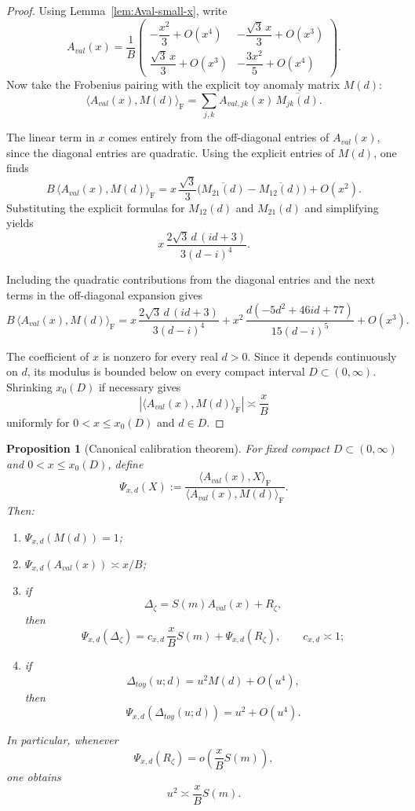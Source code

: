 \documentclass[11pt,a4paper]{amsart}
\def\toy{toy}%
\def\val{val}%
\theoremstyle{plain}
\newtheorem{proposition}[theorem]{Proposition}
\theoremstyle{definition}
\newcommand{\toy}{\mathrm{toy}}
\newcommand{\val}{\mathrm{val}}
\newcommand{\F}{\mathrm{F}}
\begin{document}
\begin{proof}
Using Lemma~\ref{lem:Aval-small-x}, write
\[
A_{\val}(x)=\frac1B
\begin{pmatrix}
-\dfrac{x^2}{3}+O(x^4) & -\dfrac{\sqrt3\,x}{3}+O(x^3)\\[1.2ex]
\dfrac{\sqrt3\,x}{3}+O(x^3) & -\dfrac{3x^2}{5}+O(x^4)
\end{pmatrix}.
\]
Now take the Frobenius pairing with the explicit toy anomaly matrix $M(d)$:
\[
\langle A_{\val}(x),M(d)\rangle_\F
=
\sum_{j,k} A_{\val,jk}(x)\,\overline{M_{jk}(d)}.
\]

The linear term in $x$ comes entirely from the off-diagonal entries of
$A_{\val}(x)$, since the diagonal entries are quadratic. Using the explicit
entries of $M(d)$, one finds
\[
B\,\langle A_{\val}(x),M(d)\rangle_\F
=
x\,\frac{\sqrt3}{3}\bigl(\overline{M_{21}(d)}-\overline{M_{12}(d)}\bigr)
+O(x^2).
\]
Substituting the explicit formulas for $M_{12}(d)$ and $M_{21}(d)$ and
simplifying yields
\[
x\,\frac{2\sqrt3\,d\,(id+3)}{3(d-i)^4}.
\]

Including the quadratic contributions from the diagonal entries and the next
terms in the off-diagonal expansion gives
\[
B\,\langle A_{\val}(x),M(d)\rangle_\F
=
x\,\frac{2\sqrt3\,d\,(id+3)}{3(d-i)^4}
+
x^2\,\frac{d(-5d^2+46id+77)}{15(d-i)^5}
+
O(x^3).
\]

The coefficient of $x$ is nonzero for every real $d>0$. Since it depends
continuously on $d$, its modulus is bounded below on every compact interval
$D\subset(0,\infty)$. Shrinking $x_0(D)$ if necessary gives
\[
|\langle A_{\val}(x),M(d)\rangle_\F|\asymp \frac{x}{B}
\]
uniformly for $0<x\le x_0(D)$ and $d\in D$.
\end{proof}

\begin{proposition}[Canonical calibration theorem]
\label{prop:canonical-calibration}
For fixed compact $D\subset(0,\infty)$ and $0<x\le x_0(D)$, define
\[
\Psi_{x,d}(X):=
\frac{\langle A_{\val}(x),X\rangle_\F}
{\langle A_{\val}(x),M(d)\rangle_\F}.
\]
Then:
\begin{enumerate}
\item $\Psi_{x,d}(M(d))=1$;
\item $\Psi_{x,d}(A_{\val}(x))\asymp x/B$;
\item if
\[
\Delta_\zeta=S(m)A_{\val}(x)+R_\zeta,
\]
then
\[
\Psi_{x,d}(\Delta_\zeta)
=
c_{x,d}\,\frac{x}{B}S(m)+\Psi_{x,d}(R_\zeta),
\qquad c_{x,d}\asymp 1;
\]
\item if
\[
\Delta_{\toy}(u;d)=u^2M(d)+O(u^4),
\]
then
\[
\Psi_{x,d}(\Delta_{\toy}(u;d))=u^2+O(u^4).
\]
\end{enumerate}
In particular, whenever
\[
\Psi_{x,d}(R_\zeta)=o\!\left(\frac{x}{B}S(m)\right),
\]
one obtains
\begin{equation}\label{eq:u2-calibration}
u^2\asymp \frac{x}{B}S(m).
\end{equation}
\end{proposition}
\end{document}
